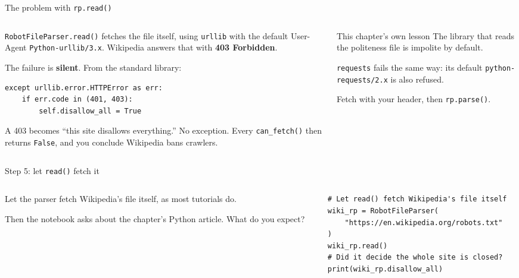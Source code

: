 \documentclass[9pt,aspectratio=169]{beamer}
\begin{document}
\begin{frame}[fragile]{The problem with \texttt{rp.read()}}
    \begin{columns}[T]
        \begin{column}{0.6\textwidth}
            \texttt{RobotFileParser.read()} fetches the file itself, using \texttt{urllib} with the default User-Agent \texttt{Python-urllib/3.x}. Wikipedia answers that with \textbf{403 Forbidden}.

            \medskip

            The failure is \textbf{silent}. From the standard library:
\begin{lstlisting}[basicstyle=\ttfamily\tiny]
except urllib.error.HTTPError as err:
    if err.code in (401, 403):
        self.disallow_all = True
\end{lstlisting}

            \medskip

            A 403 becomes ``this site disallows everything.'' No exception. Every \texttt{can\_fetch()} then returns \texttt{False}, and you conclude Wikipedia bans crawlers.
        \end{column}
        \begin{column}{0.35\textwidth}
            \begin{alertblock}{This chapter's own lesson}
                \footnotesize The library that reads the politeness file is impolite by default.

                \smallskip

                \texttt{requests} fails the same way: its default \texttt{python-requests/2.x} is also refused.

                \smallskip

                Fetch with your header, then \texttt{rp.parse()}.
            \end{alertblock}
        \end{column}
    \end{columns}
\end{frame}

\begin{frame}[fragile]{Step 5: let \texttt{read()} fetch it}
    \begin{columns}[T]
        \begin{column}{0.37\textwidth}
            Let the parser fetch Wikipedia's file itself, as most tutorials do.

            \medskip
            Then the notebook asks about the chapter's Python article. What do you expect?
        \end{column}
        \begin{column}{0.6\textwidth}
\begin{lstlisting}[basicstyle=\ttfamily\footnotesize]
# Let read() fetch Wikipedia's file itself
wiki_rp = RobotFileParser(
    "https://en.wikipedia.org/robots.txt"
)
wiki_rp.read()
# Did it decide the whole site is closed?
print(wiki_rp.disallow_all)
\end{lstlisting}
        \end{column}
    \end{columns}
\end{frame}
\end{document}
